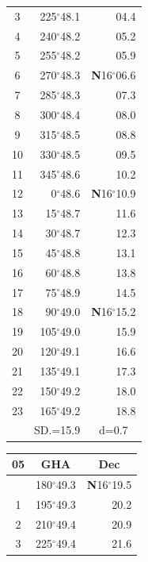 \documentclass[10pt, a4paper]{report}
\begin{document}
\begin{scriptsize}
\begin{tabular*}{0.2\textwidth}[t]{@{\extracolsep{\fill}}|c|rr|}
3 & 225$^\circ$48.1 & \raisebox{0.24ex}{\boldmath$\cdot$~\boldmath$\cdot$~~}04.4\\
4 & 240$^\circ$48.2 & 05.2\\
5 & 255$^\circ$48.2 & 05.9\\[2Pt]
6 & 270$^\circ$48.3 & \textbf{N}16$^\circ$06.6\\
7 & 285$^\circ$48.3 & 07.3\\
8 & 300$^\circ$48.4 & 08.0\\
9 & 315$^\circ$48.5 & \raisebox{0.24ex}{\boldmath$\cdot$~\boldmath$\cdot$~~}08.8\\
10 & 330$^\circ$48.5 & 09.5\\
11 & 345$^\circ$48.6 & 10.2\\[2Pt]
12 & 0$^\circ$48.6 & \textbf{N}16$^\circ$10.9\\
13 & 15$^\circ$48.7 & 11.6\\
14 & 30$^\circ$48.7 & 12.3\\
15 & 45$^\circ$48.8 & \raisebox{0.24ex}{\boldmath$\cdot$~\boldmath$\cdot$~~}13.1\\
16 & 60$^\circ$48.8 & 13.8\\
17 & 75$^\circ$48.9 & 14.5\\[2Pt]
18 & 90$^\circ$49.0 & \textbf{N}16$^\circ$15.2\\
19 & 105$^\circ$49.0 & 15.9\\
20 & 120$^\circ$49.1 & 16.6\\
21 & 135$^\circ$49.1 & \raisebox{0.24ex}{\boldmath$\cdot$~\boldmath$\cdot$~~}17.3\\
22 & 150$^\circ$49.2 & 18.0\\
23 & 165$^\circ$49.2 & 18.8\\
\hline
\rule{0pt}{2.4ex} & \multicolumn{1}{c}{SD.=15.9} & \multicolumn{1}{c|}{d=0.7}\\
\hline
\end{tabular*}\noindent
\begin{tabular*}{0.2\textwidth}[t]{@{\extracolsep{\fill}}|c|rr|}
\hline
\multicolumn{1}{|c|}{\rule{0pt}{2.6ex}\textbf{05}} & \multicolumn{1}{c}{\textbf{GHA}} & \multicolumn{1}{c|}{\textbf{Dec}}\\
\hline\rule{0pt}{2.6ex}\noindent
0 & 180$^\circ$49.3 & \textbf{N}16$^\circ$19.5\\
1 & 195$^\circ$49.3 & 20.2\\
2 & 210$^\circ$49.4 & 20.9\\
3 & 225$^\circ$49.4 & \raisebox{0.24ex}{\boldmath$\cdot$~\boldmath$\cdot$~~}21.6\\

\end{tabular*}
\end{scriptsize}
\end{document}
